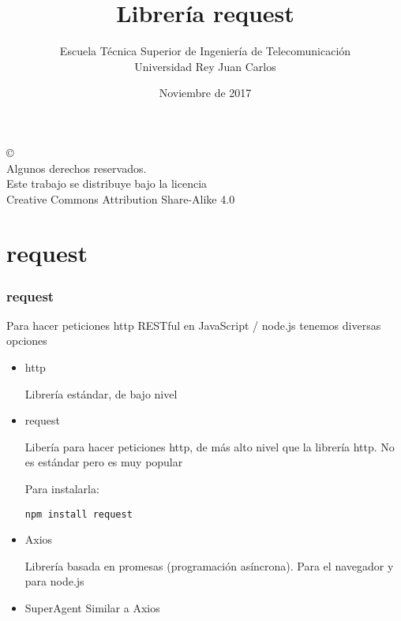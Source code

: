 \documentclass[ucs]{beamer}
\begin{document}
\title[request]{Librería request}
\author[GSyC]{Escuela Técnica Superior de Ingeniería de Telecomunicación\\
Universidad Rey Juan Carlos}
\date[2017]{Noviembre de 2017}


\begin{frame}
  \titlepage
\end{frame}




\begin{frame}[b]
\begin{flushright}
{\tiny
\copyright \insertshortdate~\insertshortauthor \\
  Algunos derechos reservados. \\
  Este trabajo se distribuye bajo la licencia \\
  Creative Commons Attribution Share-Alike 4.0
}
\end{flushright}
\end{frame}




%

\section{request}

\begin{frame}[fragile]
\frametitle{request}
Para hacer peticiones http RESTful en JavaScript / node.js tenemos diversas opciones
\begin{itemize}
\item
http

Librería estándar, de bajo nivel
\item
request

Libería para hacer peticiones http, de más alto nivel que la 
librería http. No es estándar pero es muy popular

Para instalarla:

\verb|npm install request|

\item
Axios

Librería basada en promesas (programación asíncrona). Para el navegador
y para node.js

\item
SuperAgent
Similar a Axios 
\end{itemize}
\end{frame}
\end{document}
